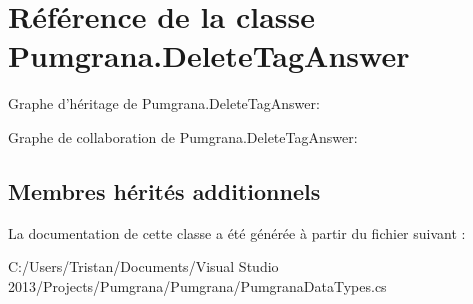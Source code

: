 \hypertarget{class_pumgrana_1_1_delete_tag_answer}{\section{Référence de la classe Pumgrana.\+Delete\+Tag\+Answer}
\label{class_pumgrana_1_1_delete_tag_answer}
}


Graphe d'héritage de Pumgrana.\+Delete\+Tag\+Answer\+:


Graphe de collaboration de Pumgrana.\+Delete\+Tag\+Answer\+:
\subsection*{Membres hérités additionnels}


La documentation de cette classe a été générée à partir du fichier suivant \+:\begin{DoxyCompactItemize}
\item 
C\+:/\+Users/\+Tristan/\+Documents/\+Visual Studio 2013/\+Projects/\+Pumgrana/\+Pumgrana/Pumgrana\+Data\+Types.\+cs\end{DoxyCompactItemize}
